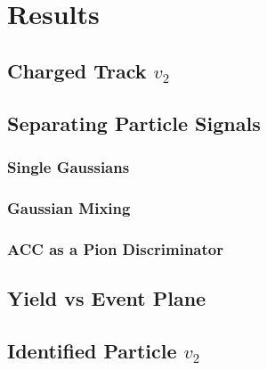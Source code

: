 
\chapter{Results} %


\section{Charged Track $v_{2}$}
\section{Separating Particle Signals}
\subsection{Single Gaussians}
\subsection{Gaussian Mixing}
\subsection{ACC as a Pion Discriminator}
\section{Yield vs Event Plane}
\section{Identified Particle $v_{2}$}

\pagebreak
\pagebreak
